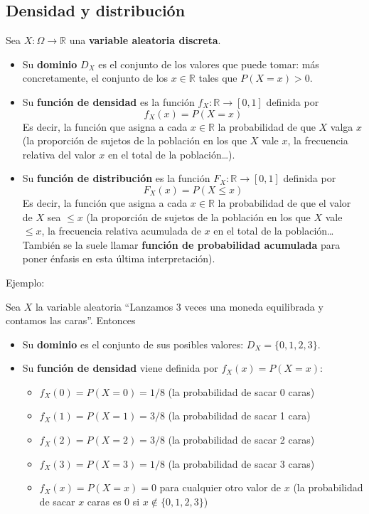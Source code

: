 \documentclass[
  spanish,
  letterpaper,
  DIV=11,
  numbers=noendperiod]{scrreprt}
\providecommand{\tightlist}{%
  \setlength{\itemsep}{0pt}\setlength{\parskip}{0pt}}
\begin{document}
\begin{tcolorbox}
\subsection{Densidad y distribución}\label{densidad-y-distribuciuxf3n}

Sea \(X: \Omega\to \mathbb{R}\) una \textbf{variable aleatoria
discreta}.

\begin{itemize}
\item
  Su \textbf{dominio} \textbf{\(D_X\)} es el conjunto de los valores que
  puede tomar: más concretamente, el conjunto de los \(x\in \mathbb{R}\)
  tales que \(P(X=x)>0\).
\item
  Su \textbf{función de densidad} es la función
  \(f_X:\mathbb{R}\to [0,1]\) definida por \[
  f_X(x)=P(X=x)
  \] Es decir, la función que asigna a cada \(x\in \mathbb{R}\) la
  probabilidad de que \(X\) valga \(x\) (la proporción de sujetos de la
  población en los que \(X\) vale \(x\), la frecuencia relativa del
  valor \(x\) en el total de la población\ldots).
\item
  Su \textbf{función de distribución} es la función
  \(F_X:\mathbb{R}\to  [0,1]\) definida por \[
  F_X(x)=P(X\leqslant x)
  \] Es decir, la función que asigna a cada \(x\in \mathbb{R}\) la
  probabilidad de que el valor de \(X\) sea \(\leqslant x\) (la
  proporción de sujetos de la población en los que \(X\) vale
  \(\leqslant x\), la frecuencia relativa acumulada de \(x\) en el total
  de la población\ldots{} También se la suele llamar \textbf{función de
  probabilidad acumulada} para poner énfasis en esta última
  interpretación).
\end{itemize}

Ejemplo:

Sea \(X\) la variable aleatoria ``Lanzamos 3 veces una moneda
equilibrada y contamos las caras''. Entonces

\begin{itemize}
\item
  Su \textbf{dominio} es el conjunto de sus posibles valores:
  \(D_X=\{0,1,2,3\}\).
\item
  Su \textbf{función de densidad} viene definida por \(f_X(x)=P(X=x)\):

  \begin{itemize}
  \tightlist
  \item
    \(f_X(0)=P(X=0)=1/8\) (la probabilidad de sacar 0 caras)
  \item
    \(f_X(1)=P(X=1)=3/8\) (la probabilidad de sacar 1 cara)
  \item
    \(f_X(2)=P(X=2)=3/8\) (la probabilidad de sacar 2 caras)
  \item
    \(f_X(3)=P(X=3)=1/8\) (la probabilidad de sacar 3 caras)
  \item
    \(f_X(x)=P(X=x)=0\) para cualquier otro valor de \(x\) (la
    probabilidad de sacar \(x\) caras es 0 si \(x\notin\{0,1,2,3\}\))
  \end{itemize}


\end{itemize}
\end{tcolorbox}
\end{document}
